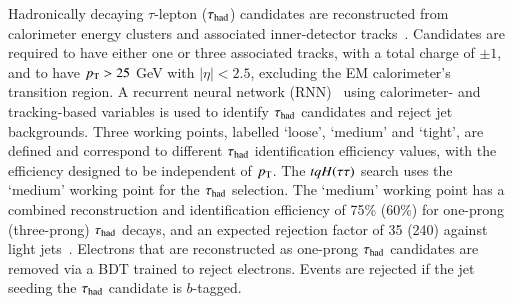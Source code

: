 Hadronically decaying $\tau$-lepton ($\tau_{\mathrm{had}}$) candidates are reconstructed from calorimeter energy clusters and
associated inner-detector tracks~\cite{ATL-PHYS-PUB-2019-033}. %
Candidates are required to have either one or three associated tracks,
with a total charge of $\pm 1$, and to have $p_{\text{T}}>25$ GeV with $|\eta|<2.5$, excluding the EM calorimeter's transition region.
A recurrent neural network (RNN)~\cite{Graves:2012SCI}
using calorimeter- and tracking-based variables is used to identify $\tau_{\mathrm{had}}$ candidates and reject jet backgrounds.
Three working points, labelled `loose', `medium' and `tight', are defined and correspond to different $\tau_{\mathrm{had}}$ identification efficiency values, with the efficiency designed to be independent of $p_{\text{T}}$. The $tqH(\tau\tau)$ search uses the `medium'
working point for the $\tau_{\mathrm{had}}$ selection.
The `medium' working point has a combined reconstruction and identification efficiency of 75\% (60\%) for one-prong (three-prong) $\tau_{\mathrm{had}}$ 
decays, and an expected rejection factor of 35 (240) against light jets~\cite{ATL-PHYS-PUB-2019-033}. 
Electrons that are reconstructed as one-prong $\tau_{\mathrm{had}}$ candidates are removed via a BDT trained to reject electrons.
Events are rejected if the jet seeding the $\tau_{\mathrm{had}}$ candidate is $b$-tagged.
